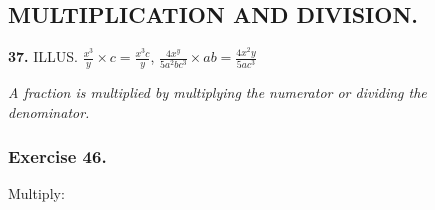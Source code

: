 \documentclass{book}
\begin{document}
\subsection*{MULTIPLICATION AND DIVISION.}

\textbf{ 37.} ILLUS. $\displaystyle \frac{x^3}{y} \times c =
\frac{x^3c}{y}$, $\displaystyle \frac{4x^y}{5a^2bc^3}\times ab =
\frac{4x^2y}{5ac^3}$

\textit{ A fraction is multiplied by multiplying the numerator or
dividing the denominator.}\footnotemark

\subsubsection*{Exercise 46.}

Multiply:
\end{document}
